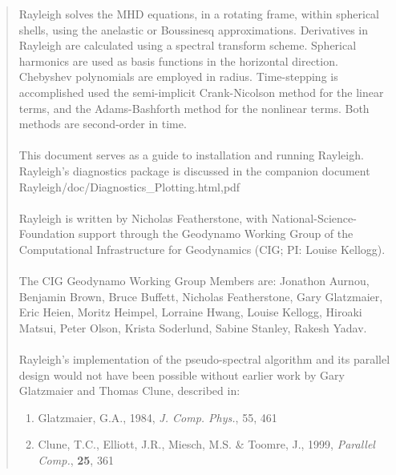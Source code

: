\documentclass[10pt, letterpaper]{article}
\begin{document}
\begin{abstract}

Rayleigh solves the MHD equations, in a rotating frame, within spherical shells, using the anelastic or Boussinesq approximations.  Derivatives in Rayleigh are calculated using a spectral transform scheme.  Spherical harmonics are used as basis functions in the horizontal direction.  Chebyshev polynomials are employed in radius.  Time-stepping is accomplished used the semi-implicit Crank-Nicolson method for the linear terms, and the Adams-Bashforth method for the nonlinear terms.  Both methods are second-order in time.
\\
\\
This document serves as a guide to installation and running Rayleigh.   Rayleigh's diagnostics package is discussed in the companion document Rayleigh/doc/Diagnostics\_Plotting.{html,pdf}
\\
\\
Rayleigh is written by Nicholas Featherstone, with National-Science-Foundation support through the Geodynamo Working Group of the Computational Infrastructure for Geodynamics (CIG; PI: Louise Kellogg).
\\
\\
The CIG Geodynamo Working Group Members are:
Jonathon Aurnou, Benjamin Brown, Bruce Buffett, Nicholas Featherstone, Gary Glatzmaier, Eric Heien, Moritz Heimpel, Lorraine Hwang, Louise Kellogg, Hiroaki Matsui, Peter Olson, Krista Soderlund, Sabine Stanley, Rakesh Yadav.
\\
\\
\noindent Rayleigh's implementation of the pseudo-spectral algorithm and its parallel design would not have been possible without earlier work by Gary Glatzmaier and Thomas Clune, described in:
\begin{enumerate}
\item Glatzmaier, G.A., 1984, \textit{J. Comp. Phys.}, 55, 461
\item Clune, T.C., Elliott, J.R., Miesch, M.S. \& Toomre, J., 1999, \textit{Parallel Comp.}, \textbf{25}, 361
\end{enumerate}

\end{abstract}
\clearpage

\tableofcontents








\end{document}
